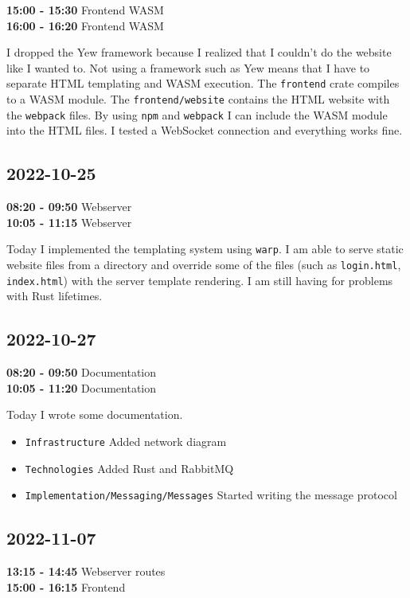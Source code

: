 \documentclass{article}
\begin{document}
\textbf{15:00 - 15:30} Frontend WASM \\
\textbf{16:00 - 16:20} Frontend WASM

I dropped the Yew framework because I realized that I couldn't do the website 
like I wanted to. Not using a framework such as Yew means that I have to separate
HTML templating and WASM execution. The \texttt{frontend} crate compiles to a WASM module.
The \texttt{frontend/website} contains the HTML website with the \texttt{webpack} files.
By using \texttt{npm} and \texttt{webpack} I can include the WASM module into the HTML files.
I tested a WebSocket connection and everything works fine.

\subsection{2022-10-25}

\textbf{08:20 - 09:50} Webserver \\
\textbf{10:05 - 11:15} Webserver

Today I implemented the templating system using \texttt{warp}.
I am able to serve static website files from a directory and override
some of the files (such as \texttt{login.html}, \texttt{index.html}) with
the server template rendering. I am still having for problems with Rust lifetimes.

\subsection{2022-10-27}

\textbf{08:20 - 09:50} Documentation \\
\textbf{10:05 - 11:20} Documentation

Today I wrote some documentation.
\begin{itemize}
    \item \texttt{Infrastructure} Added network diagram
    \item \texttt{Technologies} Added Rust and RabbitMQ
    \item \texttt{Implementation/Messaging/Messages} Started writing the message protocol
\end{itemize}

\subsection{2022-11-07}

\textbf{13:15 - 14:45} Webserver routes \\
\textbf{15:00 - 16:15} Frontend
\end{document}
